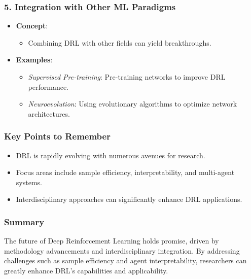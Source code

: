 \documentclass{beamer}
\begin{document}
\begin{frame}[fragile]
    \frametitle{5. Integration with Other ML Paradigms}
    \begin{itemize}
        \item \textbf{Concept}:
        \begin{itemize}
            \item Combining DRL with other fields can yield breakthroughs.
        \end{itemize}
        \item \textbf{Examples}:
        \begin{itemize}
            \item \textit{Supervised Pre-training}: Pre-training networks to improve DRL performance.
            \item \textit{Neuroevolution}: Using evolutionary algorithms to optimize network architectures.
        \end{itemize}
    \end{itemize}
\end{frame}

\begin{frame}[fragile]
    \frametitle{Key Points to Remember}
    \begin{itemize}
        \item DRL is rapidly evolving with numerous avenues for research.
        \item Focus areas include sample efficiency, interpretability, and multi-agent systems.
        \item Interdisciplinary approaches can significantly enhance DRL applications.
    \end{itemize}
\end{frame}

\begin{frame}[fragile]
    \frametitle{Summary}
    The future of Deep Reinforcement Learning holds promise, driven by methodology advancements and interdisciplinary integration. By addressing challenges such as sample efficiency and agent interpretability, researchers can greatly enhance DRL's capabilities and applicability.
\end{frame}
\end{document}

